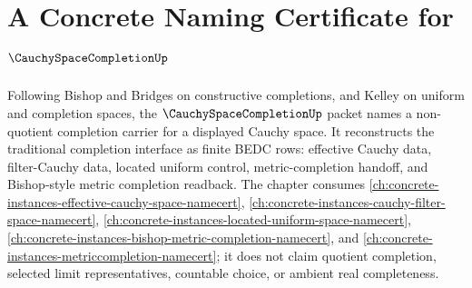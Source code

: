 \chapter{A Concrete Naming Certificate for $\CauchySpaceCompletionUp$}
\label{ch:concrete-instances-cauchy-space-completion-namecert}

Following Bishop and Bridges on constructive completions, and Kelley on uniform and completion spaces, the $\CauchySpaceCompletionUp$ packet names a non-quotient completion carrier for a displayed Cauchy space. It reconstructs the traditional completion interface as finite BEDC rows: effective Cauchy data, filter-Cauchy data, located uniform control, metric-completion handoff, and Bishop-style metric completion readback. The chapter consumes \autoref{ch:concrete-instances-effective-cauchy-space-namecert}, \autoref{ch:concrete-instances-cauchy-filter-space-namecert}, \autoref{ch:concrete-instances-located-uniform-space-namecert}, \autoref{ch:concrete-instances-bishop-metric-completion-namecert}, and \autoref{ch:concrete-instances-metriccompletion-namecert}; it does not claim quotient completion, selected limit representatives, countable choice, or ambient real completeness.

